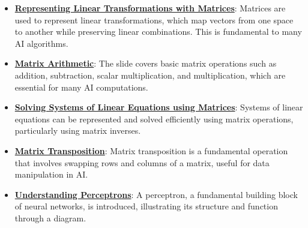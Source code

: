 \documentclass{article}%
\begin{document}
\begin{itemize}[leftmargin=*]%
\item \href{https://purdue.brightspace.com/d2l/common/assets/pdfjs-d2l-dist/1.0.14-legacy/web/viewer.html?file=\%2Fcontent\%2Fenforced\%2F1095467-wl.202510.CS.24300.001\%2F04L1-Linear Algebra Primer.pdf\%3Fou\%3D1095467\&lang=en-us\&container=d2l-fileviewer-rendered-pdf\&fullscreen=d2l-fileviewer-rendered-pdf-dialog\&height=667#page=5}{\textbf{Representing Linear Transformations with Matrices}}: Matrices are used to represent linear transformations, which map vectors from one space to another while preserving linear combinations. This is fundamental to many AI algorithms.%
\item \href{https://purdue.brightspace.com/d2l/common/assets/pdfjs-d2l-dist/1.0.14-legacy/web/viewer.html?file=\%2Fcontent\%2Fenforced\%2F1095467-wl.202510.CS.24300.001\%2F04L1-Linear Algebra Primer.pdf\%3Fou\%3D1095467\&lang=en-us\&container=d2l-fileviewer-rendered-pdf\&fullscreen=d2l-fileviewer-rendered-pdf-dialog\&height=667#page=9}{\textbf{Matrix Arithmetic}}: The slide covers basic matrix operations such as addition, subtraction, scalar multiplication, and multiplication, which are essential for many AI computations.%
\item \href{https://purdue.brightspace.com/d2l/common/assets/pdfjs-d2l-dist/1.0.14-legacy/web/viewer.html?file=\%2Fcontent\%2Fenforced\%2F1095467-wl.202510.CS.24300.001\%2F04L1-Linear Algebra Primer.pdf\%3Fou\%3D1095467\&lang=en-us\&container=d2l-fileviewer-rendered-pdf\&fullscreen=d2l-fileviewer-rendered-pdf-dialog\&height=667#page=11}{\textbf{Solving Systems of Linear Equations using Matrices}}: Systems of linear equations can be represented and solved efficiently using matrix operations, particularly using matrix inverses.%
\item \href{https://purdue.brightspace.com/d2l/common/assets/pdfjs-d2l-dist/1.0.14-legacy/web/viewer.html?file=\%2Fcontent\%2Fenforced\%2F1095467-wl.202510.CS.24300.001\%2F04L1-Linear Algebra Primer.pdf\%3Fou\%3D1095467\&lang=en-us\&container=d2l-fileviewer-rendered-pdf\&fullscreen=d2l-fileviewer-rendered-pdf-dialog\&height=667#page=16}{\textbf{Matrix Transposition}}: Matrix transposition is a fundamental operation that involves swapping rows and columns of a matrix, useful for data manipulation in AI.%
\item \href{https://purdue.brightspace.com/d2l/common/assets/pdfjs-d2l-dist/1.0.14-legacy/web/viewer.html?file=\%2Fcontent\%2Fenforced\%2F1095467-wl.202510.CS.24300.001\%2F04L1-Linear Algebra Primer.pdf\%3Fou\%3D1095467\&lang=en-us\&container=d2l-fileviewer-rendered-pdf\&fullscreen=d2l-fileviewer-rendered-pdf-dialog\&height=667#page=17}{\textbf{Understanding Perceptrons}}: A perceptron, a fundamental building block of neural networks, is introduced, illustrating its structure and function through a diagram.%

\end{itemize}
\end{document}
